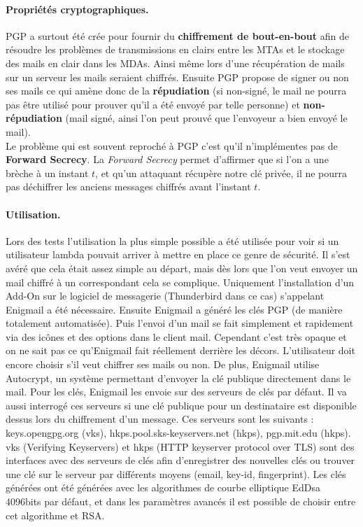 \paragraph*{Propriétés cryptographiques.}
PGP a surtout été crée pour fournir du \textbf{chiffrement de bout-en-bout} afin de résoudre les problèmes de transmissions en clairs entre les MTAs et le stockage des mails en clair dans les MDAs. Ainsi même lors d'une récupération de mails sur un serveur les mails seraient chiffrés. Ensuite PGP propose de signer ou non ses mails ce qui amène donc de la \textbf{répudiation} (si non-signé, le mail ne pourra pas être utilisé pour prouver qu'il a été envoyé par telle personne) et \textbf{non-répudiation} (mail signé, ainsi l'on peut prouvé que l'envoyeur a bien envoyé le mail).\\ 
Le problème qui est souvent reproché à PGP c'est qu'il n'implémentes pas de \textbf{Forward Secrecy}. La \textit{Forward Secrecy} permet d'affirmer que si l'on a une brèche à un instant $t$, et qu'un attaquant récupère notre clé privée, il ne pourra pas déchiffrer les anciens messages chiffrés avant l'instant $t$.
\paragraph*{Utilisation.}
Lors des tests l’utilisation la plus simple possible a été utilisée pour voir si un utilisateur lambda pouvait arriver à mettre en place ce genre de sécurité. Il s’est avéré que cela était assez simple au départ, mais dès lors que l'on veut envoyer un mail chiffré à un correspondant cela se complique. Uniquement l'installation d'un Add-On sur le logiciel de messagerie (Thunderbird dans ce cas) s’appelant Enigmail a été nécessaire. Ensuite Enigmail a généré les clés PGP (de manière totalement automatisée). Puis l'envoi d'un mail se fait simplement et rapidement via des icônes et des options dans le client mail. Cependant c’est très opaque et on ne sait pas ce qu'Enigmail fait réellement derrière les décors. L’utilisateur doit encore choisir s’il veut chiffrer ses mails ou non. De plus, Enigmail utilise Autocrypt, un système permettant d'envoyer la clé publique directement dans le mail. Pour les clés, Enigmail les envoie sur des serveurs de clés par défaut. Il va aussi interrogé ces serveurs si une clé publique pour un destinataire est disponible dessus lors du chiffrement d'un message. Ces serveurs sont les suivants : keys.opengpg.org (vks), hkps.pool.sks-keyservers.net (hkps), pgp.mit.edu (hkps). vks (Verifying Keyservers) et hkps (HTTP keyserver protocol over TLS) sont des interfaces avec des serveurs de clés afin d'enregistrer des nouvelles clés ou trouver une clé sur le serveur par différents moyens (email, key-id, fingerprint). Les clés générées ont été générées avec les algorithmes de courbe elliptique EdDsa 4096bits par défaut, et dans les paramètres avancés il est possible de choisir entre cet algorithme et RSA.
